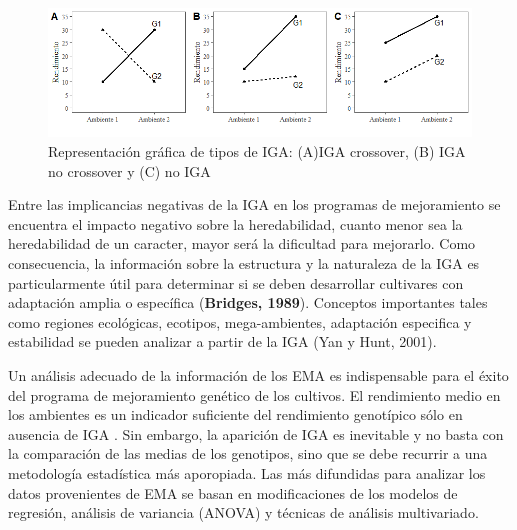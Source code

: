 \begin{figure}[h]
\begin{center}
\includegraphics[width=14cm]{./Graficos/interac}
\end{center}
\caption{Representación gráfica de tipos de IGA: (A)IGA crossover, (B) IGA no crossover y (C) no IGA}
\label{fig:fig11}
\end{figure}


Entre las implicancias negativas de la IGA en los programas de mejoramiento se encuentra el impacto negativo sobre la heredabilidad, cuanto menor sea la heredabilidad de un caracter, mayor será la dificultad para mejorarlo. Como consecuencia, la información sobre la estructura y la naturaleza de la IGA es particularmente útil para determinar si se deben desarrollar cultivares con adaptación amplia o específica (\textbf{Bridges, 1989}). Conceptos importantes tales como regiones ecológicas, ecotipos, mega-ambientes, adaptación especifica y estabilidad se pueden analizar a partir de la IGA (Yan y Hunt, 2001).

Un análisis adecuado de la información de los EMA es indispensable para el éxito del programa de mejoramiento genético de los cultivos. El rendimiento medio en los ambientes es un indicador suficiente del rendimiento genotípico sólo en ausencia de IGA \citep{YanKang2003}. Sin embargo, la aparición de IGA es inevitable y no basta con la comparación de las medias de los genotipos, sino que se debe recurrir a una metodología estadística más aporopiada. Las más difundidas para analizar los datos provenientes de EMA se basan en modificaciones de los modelos de regresión, análisis de variancia (ANOVA) y técnicas de análisis multivariado. 

